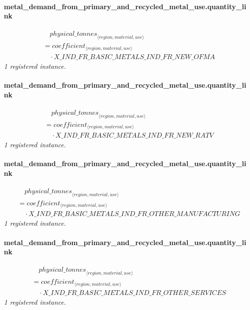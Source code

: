 \documentclass[11pt]{article}
\begin{document}
\paragraph{metal\_demand\_from\_primary\_and\_recycled\_metal\_use.quantity\_link}
\begin{align*}
&\quad {physical\_tonnes}_{\langle region, material, use\rangle}\\
&= coefficient_{\langle region, material, use\rangle}\\
&\quad {}\cdot X\_IND\_FR\_BASIC\_METALS\_IND\_FR\_NEW\_OFMA
\end{align*}
\noindent\emph{1 registered instance.}\par
\paragraph{metal\_demand\_from\_primary\_and\_recycled\_metal\_use.quantity\_link}
\begin{align*}
&\quad {physical\_tonnes}_{\langle region, material, use\rangle}\\
&= coefficient_{\langle region, material, use\rangle}\\
&\quad {}\cdot X\_IND\_FR\_BASIC\_METALS\_IND\_FR\_NEW\_RATV
\end{align*}
\noindent\emph{1 registered instance.}\par
\paragraph{metal\_demand\_from\_primary\_and\_recycled\_metal\_use.quantity\_link}
\begin{align*}
&\quad {physical\_tonnes}_{\langle region, material, use\rangle}\\
&= coefficient_{\langle region, material, use\rangle}\\
&\quad {}\cdot X\_IND\_FR\_BASIC\_METALS\_IND\_FR\_OTHER\_MANUFACTURING
\end{align*}
\noindent\emph{1 registered instance.}\par
\paragraph{metal\_demand\_from\_primary\_and\_recycled\_metal\_use.quantity\_link}
\begin{align*}
&\quad {physical\_tonnes}_{\langle region, material, use\rangle}\\
&= coefficient_{\langle region, material, use\rangle}\\
&\quad {}\cdot X\_IND\_FR\_BASIC\_METALS\_IND\_FR\_OTHER\_SERVICES
\end{align*}
\noindent\emph{1 registered instance.}\par
\end{document}
